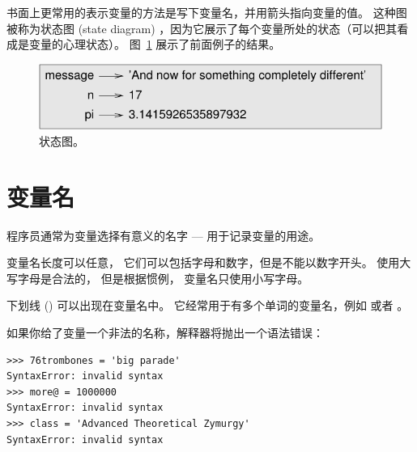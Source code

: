 书面上更常用的表示变量的方法是写下变量名，并用箭头指向变量的值。 这种图被称为状态图 (state diagram) ，因为它展示了每个变量所处的状态（可以把其看成是变量的心理状态）。 图~\ref{fig.state2} 展示了前面例子的结果。

\begin{figure}
\centerline
{\includegraphics[scale=0.8]{../source/figs/state2.pdf}}
\caption{状态图。}
\label{fig.state2}
\end{figure}

\section{变量名}


程序员通常为变量选择有意义的名字 --- 用于记录变量的用途。

变量名长度可以任意， 它们可以包括字母和数字，但是不能以数字开头。 使用大写字母是合法的， 但是根据惯例， 变量名只使用小写字母。

下划线 (\li{_}) 可以出现在变量名中。 它经常用于有多个单词的变量名，例如  或者 。
 

如果你给了变量一个非法的名称，解释器将抛出一个语法错误：

\begin{lstlisting}
>>> 76trombones = 'big parade'
SyntaxError: invalid syntax
>>> more@ = 1000000
SyntaxError: invalid syntax
>>> class = 'Advanced Theoretical Zymurgy'
SyntaxError: invalid syntax
\end{lstlisting}


